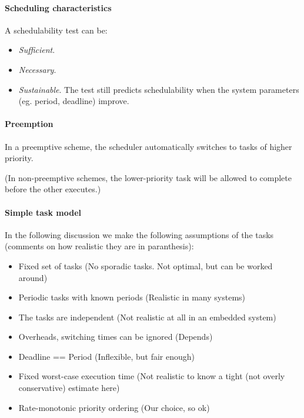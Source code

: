 \paragraph{Scheduling characteristics} A schedulability test can be:
\begin{itemize}[nolistsep,noitemsep]
  \item \textit{Sufficient}.
  \item \textit{Necessary}.
  \item \textit{Sustainable}. The test still predicts schedulability when the system parameters (eg. period, deadline) improve.
\end{itemize}

\paragraph{Preemption} In a preemptive scheme, the scheduler automatically switches to tasks of higher priority.

(In non-preemptive schemes, the lower-priority task will be allowed to complete before the other executes.)

\paragraph{Simple task model} In the following discussion we make the following assumptions of the tasks (comments on how realistic they are in paranthesis):
\begin{itemize}[nolistsep,noitemsep]
  \item Fixed set of tasks (No sporadic tasks. Not optimal, but can be worked around)
  \item Periodic tasks with known periods (Realistic in many systems)
  \item The tasks are independent (Not realistic at all in an embedded system)
  \item Overheads, switching times can be ignored (Depends)
  \item Deadline == Period (Inflexible, but fair enough)
  \item Fixed worst-case execution time (Not realistic to know a tight (not overly conservative) estimate here)
  \item Rate-monotonic priority ordering (Our choice, so ok)
\end{itemize}

